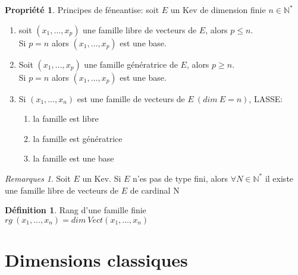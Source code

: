 \documentclass[fleqn]{article}
\theoremstyle{definition} \newtheorem*{defi}{D\'efinition}
\theoremstyle{definition} \newtheorem*{theo}{Th\'eor\`eme}
\theoremstyle{definition} \newtheorem*{coro}{Corollaire}
\theoremstyle{definition} \newtheorem*{nota}{Notation}
\theoremstyle{remark} \newtheorem*{rqs}{Remarques}
\theoremstyle{definition} \newtheorem*{prop}{Propri\'et\'e}
\begin{document}
\begin{prop} Principes de f\'eneantise: soit $E$ un Kev de dimension finie $n \in \mathbb{N}^*$
	\begin{enumerate}
		\item soit $(x_1, \hdots, x_p)$ une famille libre de vecteurs de $E$, alors $p \leq n$.\\ Si $p = n$ alors $(x_1, \hdots, x_p)$ est une
		base.
		\item Soit $(x_1, \hdots, x_p)$ une famille g\'en\'eratrice de $E$, alors $p \geq n$.\\ Si $p = n$ alors $(x_1, \hdots, x_p)$ est une
		base.
		\item Si $(x_1, \hdots, x_n)$ est une famille de vecteurs de $E\ (dim\ E = n)$, LASSE:
			\begin{enumerate}
				\item la famille est libre
				\item la famille est g\'en\'eratrice
				\item la famille est une base
			\end{enumerate}
	\end{enumerate}
\end{prop}

\begin{rqs}
	Soit $E$ un Kev. Si $E$ n'es pas de type fini, alors $\forall N \in \mathbb{N}^*$ il existe une famille libre de vecteurs de $E$ de cardinal N
\end{rqs}

\begin{defi} Rang d'une famille finie\\
	$rg\ (x_1, \hdots, x_n) = dim\ Vect(x_1, \hdots, x_n)$
\end{defi}

\section{Dimensions classiques}
\end{document}
